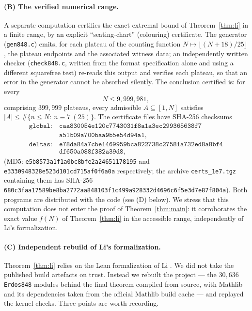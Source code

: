 \documentclass[11pt,a4paper]{article}
\theoremstyle{plain}
\theoremstyle{definition}
\theoremstyle{remark}
\begin{document}
\paragraph{(B) The verified numerical range.}
A separate computation certifies the exact extremal bound of Theorem~\ref{thm:li} in a finite
range, by an explicit ``seating-chart'' (colouring) certificate. The generator
(\texttt{gen848.c}) emits, for each plateau of the counting function
$N\mapsto\lfloor(N+18)/25\rfloor$, the plateau endpoints and the associated witness data; an
independently written checker (\texttt{check848.c}, written from the format specification alone
and using a different squarefree test) re-reads this output and verifies each plateau, so that an
error in the generator cannot be absorbed silently. The conclusion certified is: for every
\[
N \le 9{,}999{,}981,
\]
comprising $399{,}999$ plateaus, every admissible $A\subseteq[1,N]$ satisfies
$|A|\le\#\{n\le N:\ n\equiv 7\ (25)\}$. The certificate files have SHA-256 checksums
\[
\begin{aligned}
\texttt{global:}\ &\texttt{caa830054e120c7743031f8a1a3ec299365638f7}\\
&\texttt{a51b09a700baa9b5e54d94a1},\\
\texttt{deltas:}\ &\texttt{e78da84a7cbe1469959bca822738c27581a732ed8a8bf4}\\
&\texttt{df650a088f382a39d8},
\end{aligned}
\]
(MD5: \texttt{e5b8573a1f1a0bc8bfe2a24651178195} and \texttt{e3330948328e523d101cd715af0f6a0a}
respectively; the archive \texttt{certs\_1e7.tgz} containing them has SHA-256
\texttt{680c3faa17589be8ba2772aa848103f1c499a928332d4696c6f5e3d7e87f804a}). Both programs are
distributed with the code (see (D) below). We stress that this computation does not enter the
proof of Theorem~\ref{thm:main}: it corroborates the exact value $f(N)$ of
Theorem~\ref{thm:li} in the accessible range, independently of Li's formalization.

\paragraph{(C) Independent rebuild of Li's formalization.}
Theorem~\ref{thm:li} relies on the Lean formalization of Li
\cite{Li,LiRepo}. We did not take the published build artefacts on trust. Instead we rebuilt the
project --- the $30{,}636$ \texttt{Erdos848} modules behind the final theorem compiled from source,
with Mathlib and its dependencies taken from the official Mathlib build cache --- and replayed the
kernel checks. Three points are worth recording.
\end{document}
